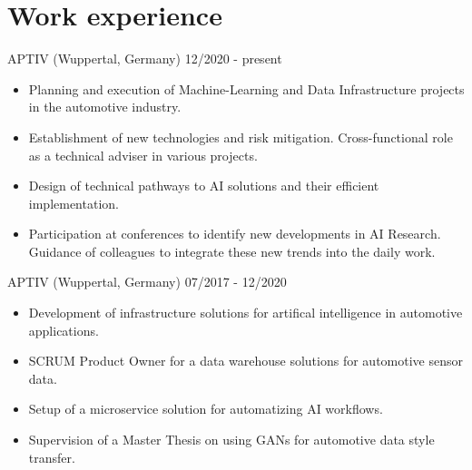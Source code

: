 \documentclass[singlesided,
               paper=a4,
               fontsize=10pt
              ]{my-resume}
\begin{document}
\section[\faBriefcase]{Work experience}
    {APTIV (Wuppertal, Germany)}
    {12/2020 - present}
    {\begin{itemize}
        \item Planning and execution of Machine-Learning and Data Infrastructure projects in the automotive industry. 
        \item Establishment of new technologies and risk mitigation. Cross-functional role as a technical adviser in various projects. 
        \item Design of technical pathways to AI solutions and their efficient implementation.
        \item Participation at conferences to identify new developments in AI Research. Guidance of colleagues to integrate these new trends into the daily work.
    \end{itemize}}
    {APTIV (Wuppertal, Germany)}
    {07/2017 - 12/2020}
    {\begin{itemize}
        \item Development of infrastructure solutions for artifical intelligence in automotive applications. 
        \item SCRUM Product Owner for a data warehouse solutions for automotive sensor data. 
        \item Setup of a microservice solution for automatizing AI workflows.
        \item Supervision of a Master Thesis on using GANs for automotive data style transfer.
    \end{itemize}}
\end{document}
